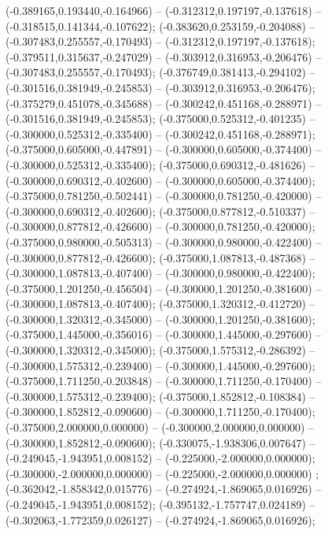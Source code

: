  (-0.389165,0.193440,-0.164966) -- (-0.312312,0.197197,-0.137618) -- (-0.318515,0.141344,-0.107622);
 (-0.383620,0.253159,-0.204088) -- (-0.307483,0.255557,-0.170493) -- (-0.312312,0.197197,-0.137618);
 (-0.379511,0.315637,-0.247029) -- (-0.303912,0.316953,-0.206476) -- (-0.307483,0.255557,-0.170493);
 (-0.376749,0.381413,-0.294102) -- (-0.301516,0.381949,-0.245853) -- (-0.303912,0.316953,-0.206476);
 (-0.375279,0.451078,-0.345688) -- (-0.300242,0.451168,-0.288971) -- (-0.301516,0.381949,-0.245853);
 (-0.375000,0.525312,-0.401235) -- (-0.300000,0.525312,-0.335400) -- (-0.300242,0.451168,-0.288971);
 (-0.375000,0.605000,-0.447891) -- (-0.300000,0.605000,-0.374400) -- (-0.300000,0.525312,-0.335400);
 (-0.375000,0.690312,-0.481626) -- (-0.300000,0.690312,-0.402600) -- (-0.300000,0.605000,-0.374400);
 (-0.375000,0.781250,-0.502441) -- (-0.300000,0.781250,-0.420000) -- (-0.300000,0.690312,-0.402600);
 (-0.375000,0.877812,-0.510337) -- (-0.300000,0.877812,-0.426600) -- (-0.300000,0.781250,-0.420000);
 (-0.375000,0.980000,-0.505313) -- (-0.300000,0.980000,-0.422400) -- (-0.300000,0.877812,-0.426600);
 (-0.375000,1.087813,-0.487368) -- (-0.300000,1.087813,-0.407400) -- (-0.300000,0.980000,-0.422400);
 (-0.375000,1.201250,-0.456504) -- (-0.300000,1.201250,-0.381600) -- (-0.300000,1.087813,-0.407400);
 (-0.375000,1.320312,-0.412720) -- (-0.300000,1.320312,-0.345000) -- (-0.300000,1.201250,-0.381600);
 (-0.375000,1.445000,-0.356016) -- (-0.300000,1.445000,-0.297600) -- (-0.300000,1.320312,-0.345000);
 (-0.375000,1.575312,-0.286392) -- (-0.300000,1.575312,-0.239400) -- (-0.300000,1.445000,-0.297600);
 (-0.375000,1.711250,-0.203848) -- (-0.300000,1.711250,-0.170400) -- (-0.300000,1.575312,-0.239400);
 (-0.375000,1.852812,-0.108384) -- (-0.300000,1.852812,-0.090600) -- (-0.300000,1.711250,-0.170400);
 (-0.375000,2.000000,0.000000) -- (-0.300000,2.000000,0.000000) -- (-0.300000,1.852812,-0.090600);
 (-0.330075,-1.938306,0.007647) -- (-0.249045,-1.943951,0.008152) -- (-0.225000,-2.000000,0.000000);
 (-0.300000,-2.000000,0.000000) -- (-0.225000,-2.000000,0.000000) ;
 (-0.362042,-1.858342,0.015776) -- (-0.274924,-1.869065,0.016926) -- (-0.249045,-1.943951,0.008152);
 (-0.395132,-1.757747,0.024189) -- (-0.302063,-1.772359,0.026127) -- (-0.274924,-1.869065,0.016926);
